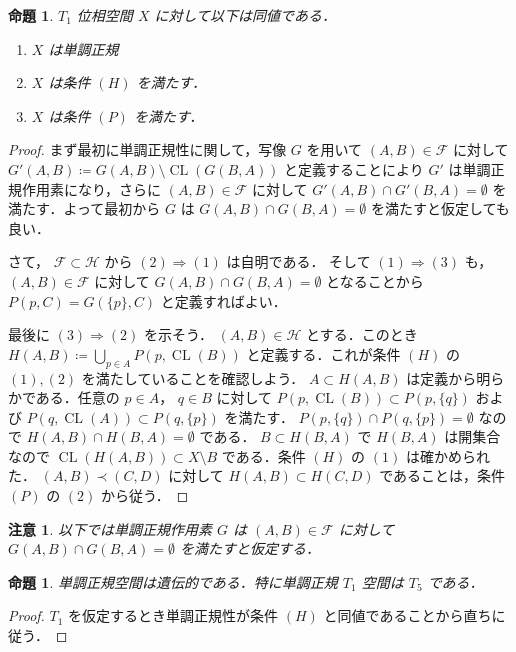 \documentclass[leqno, 12pt]{ltjsarticle}
\newtheorem{prop}[thm]{命題}
\newtheorem*{rmk}{注意}
\newcommand{\To}{\Longrightarrow}
\DeclareMathOperator{\cl}{CL}
\begin{document}
\begin{prop}
$T_{1}$
位相空間
$X$
に対して以下は同値である．
\begin{enumerate}[label=\textup{(\arabic*)}]
\item
$X$
は単調正規
\item
$X$
は条件
$(H)$
を満たす．
\item
$X$
は条件
$(P)$
を満たす．
\end{enumerate}
\end{prop}
\begin{proof}
まず最初に単調正規性に関して，写像
$G$
を用いて
$(A,B)\in \mathcal{F}$
に対して
$G'(A,B)\coloneqq G(A,B)\setminus \cl(G(B,A))$
と定義することにより
$G'$
は単調正規作用素になり，さらに
$(A,B)\in \mathcal{F}$
に対して
$G'(A,B)\cap G'(B,A)=\emptyset$
を満たす．よって最初から
$G$
は
$G(A,B)\cap G(B,A)=\emptyset$
を満たすと仮定しても良い．

さて，
$\mathcal{F}\subset \mathcal{H}$
から
$(2)\To (1)$
は自明である．
そして
$(1)\To (3)$
も，
$(A,B)\in \mathcal{F}$
に対して
$G(A,B)\cap G(B,A)=\emptyset$
となることから
$P(p,C)=G(\{p\}, C)$
と定義すればよい．

最後に
$(3)\To (2)$
を示そう．
$(A,B)\in \mathcal{H}$
とする．このとき
$H(A, B)\coloneqq\bigcup_{p\in A}P(p, \cl(B))$
と定義する．これが条件
$(H)$
の
$(1), (2)$
を満たしていることを確認しよう．
$A\subset H(A, B)$
は定義から明らかである．任意の
$p\in A$，
$q\in B$
に対して
$P(p, \cl(B))\subset P(p, \{q\})$
および
$P(q, \cl(A))\subset P(q,\{p\})$
を満たす．
$P(p, \{q\})\cap P(q,\{p\})=\emptyset$
なので
$H(A,B)\cap H(B, A)=\emptyset$
である．
$B\subset H(B,A)$
で
$H(B,A)$
は開集合なので
$\cl(H(A,B))\subset X\setminus B$
である．条件
$(H)$
の
$(1)$
は確かめられた．
$(A,B)\prec (C,D)$
に対して
$H(A,B)\subset H(C,D)$
であることは，条件
$(P)$
の
$(2)$
から従う．
\end{proof}

\begin{rmk}
以下では単調正規作用素
$G$
は
$(A,B)\in \mathcal{F}$
に対して
$G(A,B)\cap G(B,A)=\emptyset$
を満たすと仮定する．
\end{rmk}

\begin{prop}
単調正規空間は遺伝的である．特に単調正規
$T_{1}$
空間は
$T_{5}$
である．
\end{prop}
\begin{proof}
$T_{1}$
を仮定するとき単調正規性が条件
$(H)$
と同値であることから直ちに従う．
\end{proof}
\end{document}
